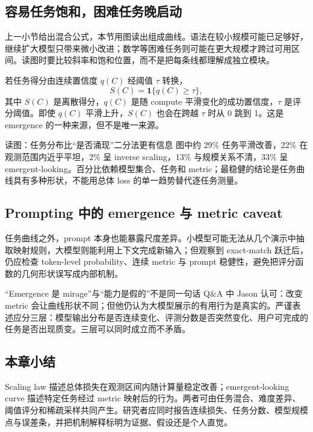 \subsection{容易任务饱和，困难任务晚启动}

上一小节给出混合公式，本节用图读出组成曲线。语法在较小规模可能已足够好，继续扩大模型只带来微小改进；数学等困难任务则可能在更大规模才跨过可用区间。读图时要比较斜率和饱和位置，而不是把每条线都理解成独立模块。


若任务得分由连续置信度 $q(C)$ 经阈值 $\tau$ 转换，
\[
S(C)=\mathbf{1}\{q(C)\ge \tau\},
\]
其中 $S(C)$ 是离散得分，$q(C)$ 是随 compute 平滑变化的成功置信度，$\tau$ 是评分阈值。即使 $q(C)$ 平滑上升，$S(C)$ 也会在跨越 $\tau$ 时从 0 跳到 1。这是 emergence 的一种来源，但不是唯一来源。


\begin{knowledgebox}{读图：任务分布比“是否涌现”二分法更有信息}
图中约 29\% 任务平滑改善，22\% 在观测范围内近乎平坦，2\% 呈 inverse scaling，13\% 与规模关系不清，33\% 呈 emergent-looking。百分比依赖模型集合、任务和 metric；最稳健的结论是任务曲线具有多种形状，不能用总体 loss 的单一趋势替代逐任务测量。
\end{knowledgebox}


\subsection{Prompting 中的 emergence 与 metric caveat}

任务曲线之外，prompt 本身也能暴露尺度差异。小模型可能无法从几个演示中抽取映射规则，大模型则能利用上下文完成新输入；但观察到 exact-match 跃迁后，仍应检查 token-level probability、连续 metric 与 prompt 稳健性，避免把评分函数的几何形状误写成内部机制。


\begin{warningbox}{“Emergence 是 mirage”与“能力是假的”不是同一句话}
Q\&A 中 Jason 认可：改变 metric 会让曲线形状不同；但他仍认为大模型展示的有用行为是真实的。严谨表述应分三层：模型输出分布是否连续变化、评测分数是否突然变化、用户可完成的任务是否出现质变。三层可以同时成立而不矛盾。
\end{warningbox}


\subsection{本章小结}

Scaling law 描述总体损失在观测区间内随计算量稳定改善；emergent-looking curve 描述特定任务经过 metric 映射后的行为。两者可由任务混合、难度差异、阈值评分和稀疏采样共同产生。研究者应同时报告连续损失、任务分数、模型规模点与误差条，并把机制解释标明为证据、假设还是个人直觉。

